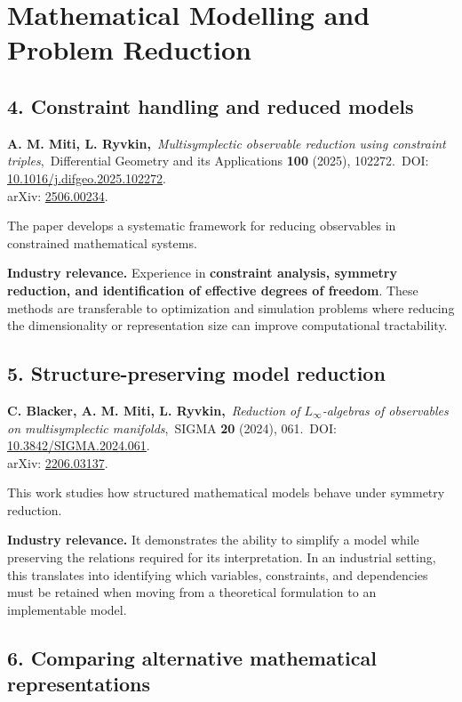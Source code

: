 \documentclass[10pt,a4paper]{article}
\newcommand{\relevance}[1]{\textbf{Industry relevance.} #1}
\begin{document}
\section*{Mathematical Modelling and Problem Reduction}

\subsection*{4. Constraint handling and reduced models}

\textbf{A. M. Miti, L. Ryvkin,}\
\textit{Multisymplectic observable reduction using constraint triples},\
Differential Geometry and its Applications \textbf{100} (2025), 102272.\
DOI: \href{https://doi.org/10.1016/j.difgeo.2025.102272}{10.1016/j.difgeo.2025.102272}.\\
arXiv: \href{https://arxiv.org/abs/2506.00234}{2506.00234}.

The paper develops a systematic framework for reducing observables in constrained mathematical systems.

\relevance{Experience in \textbf{constraint analysis, symmetry reduction, and identification of effective degrees of
freedom}. These methods are transferable to optimization and simulation problems where reducing the dimensionality or
representation size can improve computational tractability.}

\subsection*{5. Structure-preserving model reduction}

\textbf{C. Blacker, A. M. Miti, L. Ryvkin,}\
\textit{Reduction of $L_\infty$-algebras of observables on multisymplectic manifolds},\
SIGMA \textbf{20} (2024), 061.\
DOI: \href{https://doi.org/10.3842/SIGMA.2024.061}{10.3842/SIGMA.2024.061}.\\
arXiv: \href{https://arxiv.org/abs/2206.03137}{2206.03137}.

This work studies how structured mathematical models behave under symmetry reduction.

\relevance{It demonstrates the ability to simplify a model while preserving the relations required for its interpretation.
In an industrial setting, this translates into identifying which variables, constraints, and dependencies must be retained
when moving from a theoretical formulation to an implementable model.}

\subsection*{6. Comparing alternative mathematical representations}
\end{document}
